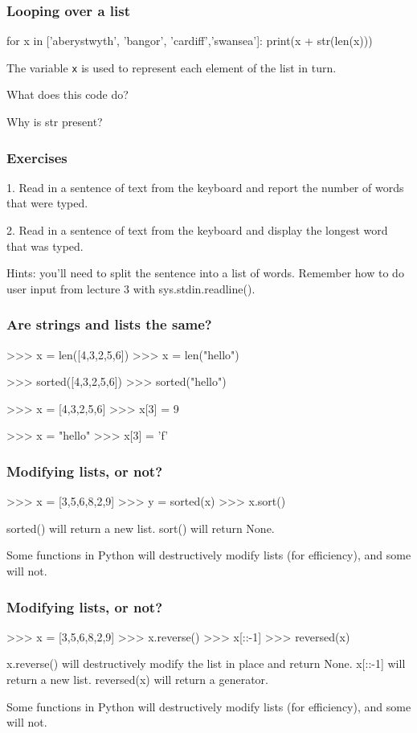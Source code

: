 \documentclass{beamer}
\begin{document}
\begin{frame}[fragile]
\frametitle{Looping over a list}
\begin{code}
for x in ['aberystwyth', 'bangor', 'cardiff','swansea']:
   print(x + str(len(x)))
\end{code}

The variable \texttt{x} is used to represent each element of the list
in turn.

What does this code do?

Why is str present?
\end{frame}

\begin{frame}[fragile]
\frametitle{Exercises}
1. Read in a sentence of text from the keyboard and report the number of
words that were typed.

\bigskip

2. Read in a sentence of text from the keyboard and display the longest word
that was typed.

\bigskip 

Hints: you'll need to split the sentence into a list of words. Remember
how to do user input from lecture 3 with sys.stdin.readline().
\end{frame}


\begin{frame}[fragile]
\frametitle{Are strings and lists the same?}
\begin{code}
>>> x = len([4,3,2,5,6])
>>> x = len("hello")

>>> sorted([4,3,2,5,6])
>>> sorted("hello")

>>> x = [4,3,2,5,6]
>>> x[3] = 9

>>> x = "hello"
>>> x[3] = 'f'
\end{code}

\end{frame}


\begin{frame}[fragile]
\frametitle{Modifying lists, or not?}
\begin{code}
>>> x = [3,5,6,8,2,9]
>>> y = sorted(x)
>>> x.sort()
\end{code}

sorted() will return a new list. sort() will return None.

\bigskip

Some functions in Python will destructively modify lists (for
efficiency), and some will not. 
\end{frame}

\begin{frame}[fragile]
\frametitle{Modifying lists, or not?}
\begin{code}
>>> x = [3,5,6,8,2,9]
>>> x.reverse()
>>> x[::-1]
>>> reversed(x)
\end{code}

x.reverse() will destructively modify the list in place and return None. x[::-1] will
return a new list. reversed(x) will return a generator. 

\bigskip

Some functions in Python will destructively modify lists (for
efficiency), and some will not. 
\end{frame}
\end{document}
